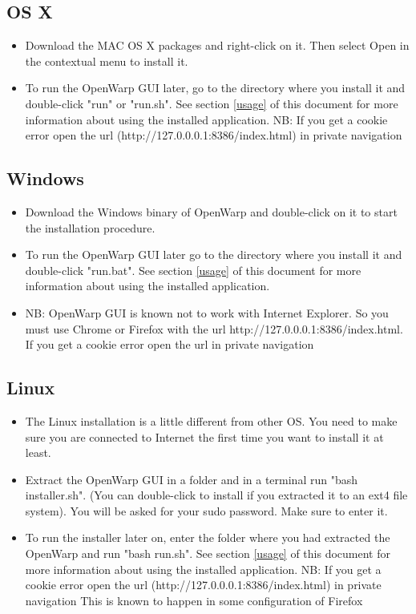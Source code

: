 \documentclass[12pt]{article}
\begin{document}
\subsection{OS X}

\begin{itemize}
	\item Download the MAC OS X packages and right-click on it. Then select Open in the contextual menu to install it.
\item To run the OpenWarp GUI later, go to the directory where you install it and double-click "run" or "run.sh". See section \ref{usage} of this document for more information about using the installed application.
NB:
If you get a cookie error open the url (http://127.0.0.0.1:8386/index.html) in private navigation
\end{itemize}

\subsection{Windows}

\begin{itemize}
	\item Download the Windows binary of OpenWarp and double-click on it to start the installation procedure.
 \item To run the OpenWarp GUI later go to the directory where you install it and double-click "run.bat". See section \ref{usage} of this document for more information about using the installed application.
\item NB: OpenWarp GUI is known not to work with Internet Explorer. So you must use Chrome or Firefox with the url http://127.0.0.0.1:8386/index.html.
If you get a cookie error open the url in private navigation
\end{itemize}


\subsection{Linux}

\begin{itemize}
	\item The Linux installation is a little different from other OS. You need to make sure you are connected to Internet the first time you want to install it at least.
\item Extract the OpenWarp GUI in a folder and in a terminal run "bash installer.sh". (You can double-click to install if you extracted it to an ext4 file system). You will be asked for your sudo password. Make sure to enter it.
\item To run the installer later on, enter the folder where you had extracted the OpenWarp and run "bash run.sh". See section \ref{usage} of this document for more information about using the installed application.
NB:
If you get a cookie error open the url (http://127.0.0.0.1:8386/index.html) in private navigation This is known to happen in some configuration of Firefox
\end{itemize}
\end{document}
